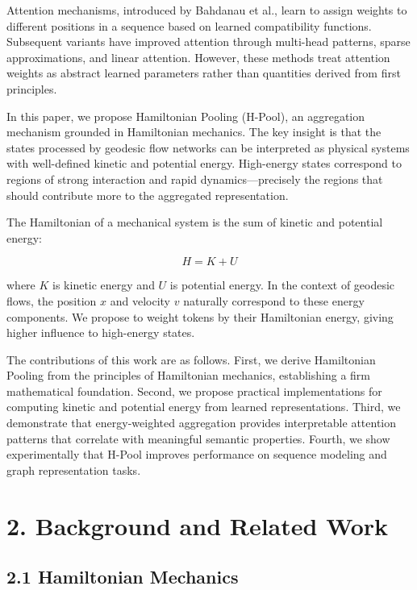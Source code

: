 \documentclass[12pt]{article}
\begin{document}
Attention mechanisms, introduced by Bahdanau et al., learn to assign weights to different positions in a sequence based on learned compatibility functions. Subsequent variants have improved attention through multi-head patterns, sparse approximations, and linear attention. However, these methods treat attention weights as abstract learned parameters rather than quantities derived from first principles.

In this paper, we propose Hamiltonian Pooling (H-Pool), an aggregation mechanism grounded in Hamiltonian mechanics. The key insight is that the states processed by geodesic flow networks can be interpreted as physical systems with well-defined kinetic and potential energy. High-energy states correspond to regions of strong interaction and rapid dynamics—precisely the regions that should contribute more to the aggregated representation.

The Hamiltonian of a mechanical system is the sum of kinetic and potential energy:

\begin{equation}
H = K + U
\end{equation}

where $K$ is kinetic energy and $U$ is potential energy. In the context of geodesic flows, the position $x$ and velocity $v$ naturally correspond to these energy components. We propose to weight tokens by their Hamiltonian energy, giving higher influence to high-energy states.

The contributions of this work are as follows. First, we derive Hamiltonian Pooling from the principles of Hamiltonian mechanics, establishing a firm mathematical foundation. Second, we propose practical implementations for computing kinetic and potential energy from learned representations. Third, we demonstrate that energy-weighted aggregation provides interpretable attention patterns that correlate with meaningful semantic properties. Fourth, we show experimentally that H-Pool improves performance on sequence modeling and graph representation tasks.

\section{2. Background and Related Work}

\subsection{2.1 Hamiltonian Mechanics}
\end{document}
